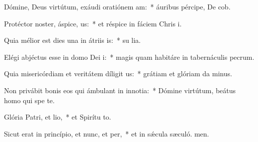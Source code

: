\item Dómine, Deus virtútum, exáudi oratiónem am:~* áuribus pércipe, De cob.
\item Protéctor noster, áspice, us:~* et réspice in fáciem Chris i.
\item Quia mélior est dies una in átriis is:~* su lia.
\item Elégi abjéctus esse in domo Dei i:~* magis quam habitáre in tabernáculis pecrum.
\item Quia misericórdiam et veritátem díligit us:~* grátiam et glóriam da minus.
\item Non privábit bonis eos qui ámbulant in innotia:~* Dómine virtútum, beátus homo qui spe  te.
\item Glória Patri, et lio,~* et Spirítu to.
\item Sicut erat in princípio, et nunc, et per,~* et in sǽcula sæculó. men.
